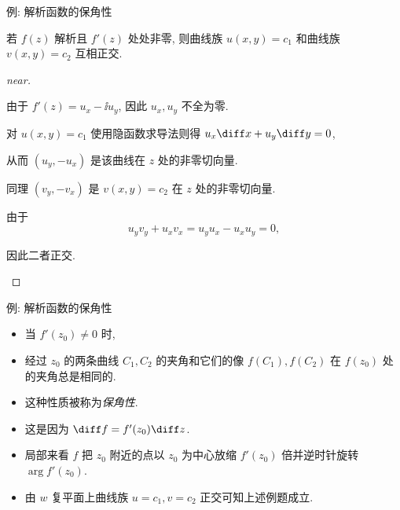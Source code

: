 \begin{frame}{例: 解析函数的保角性\noexer}
	\onslide<+->
	\begin{example}[near]
		若 $f(z)$ 解析且 $f'(z)$ 处处非零, 则曲线族 $u(x,y)=c_1$ 和曲线族 $v(x,y)=c_2$ 互相正交.
	\end{example}
	\onslide<+->
	\begin{proof}[near]
		\begin{itemize*}
			\item 由于 $f'(z)=u_x-\ii u_y$, 因此 $u_x,u_y$ 不全为零.
			\item 对 $u(x,y)=c_1$ 使用隐函数求导法则得 $u_x\diff x+u_y\diff y=0$,
			\item 从而 $(u_y,-u_x)$ 是该曲线在 $z$ 处的非零切向量.
		\end{itemize*}
		\begin{itemize*}
			\item 同理 $(v_y,-v_x)$ 是 $v(x,y)=c_2$ 在 $z$ 处的非零切向量.
			\item 由于
			\[
				u_yv_y+u_xv_x=u_yu_x-u_xu_y=0,
			\]
			\item 因此二者正交.\qedhere
			\meddel
		\end{itemize*}
	\end{proof}
\end{frame}


\begin{frame}{例: 解析函数的保角性\noexer}
	\begin{itemize}
		\item 当 $f'(z_0)\neq 0$ 时, 
		\item 经过 $z_0$ 的两条曲线 $C_1,C_2$ 的夹角和它们的像 $f(C_1),f(C_2)$ 在 $f(z_0)$ 处的夹角总是相同的.
		\item 这种性质被称为\emph{保角性}.
		\item 这是因为 $\diff f=f'(z_0)\diff z$.
		\item 局部来看 $f$ 把 $z_0$ 附近的点以 $z_0$ 为中心放缩 $f'(z_0)$ 倍并逆时针旋转 $\arg{f'(z_0)}$.
		\item 由 $w$ 复平面上曲线族 $u=c_1,v=c_2$ 正交可知上述例题成立.
	\end{itemize}
\end{frame}

